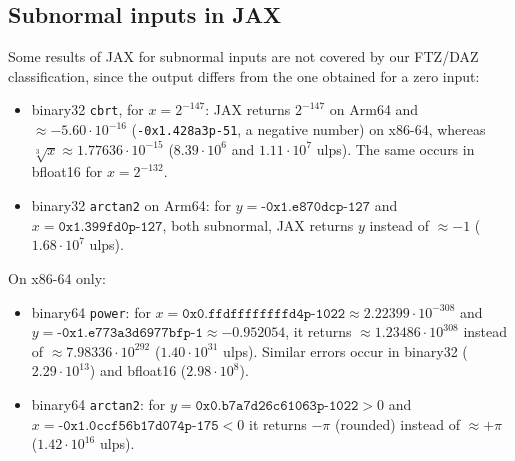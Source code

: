 \documentclass[11pt,a4paper]{article}
\begin{document}
\subsection{Subnormal inputs in JAX}
Some results of JAX for subnormal inputs are not covered by our FTZ/DAZ classification, since the output differs from the one obtained for a zero input:
\begin{itemize}
\item binary32 \texttt{cbrt}, for $x=2^{-147}$: JAX returns $2^{-147}$ on Arm64 and $\approx -5.60\cdot10^{-16}$ (\texttt{-0x1.428a3p-51}, a negative number) on x86-64, whereas $\sqrt[3]{x}\approx 1.77636\cdot10^{-15}$ ($8.39\cdot10^6$ and $1.11\cdot10^7$ ulps). The same occurs in bfloat16 for $x=2^{-132}$.
\item binary32 \texttt{arctan2} on Arm64: for $y=\texttt{-0x1.e870dcp-127}$ and $x=\texttt{0x1.399fd0p-127}$, both subnormal, JAX returns $y$ instead of $\approx -1$ ($1.68\cdot10^7$ ulps).
\end{itemize}
On x86-64 only:
\begin{itemize}
\item binary64 \texttt{power}: for $x=\texttt{0x0.ffdffffffffd4p-1022}\approx 2.22399\cdot10^{-308}$ and $y=\texttt{-0x1.e773a3d6977bfp-1}\approx -0.952054$, it returns $\approx 1.23486\cdot10^{308}$ instead of $\approx 7.98336\cdot10^{292}$ ($1.40\cdot10^{31}$ ulps). Similar errors occur in binary32 ($2.29\cdot10^{13}$) and bfloat16 ($2.98\cdot10^8$).
\item binary64 \texttt{arctan2}: for $y=\texttt{0x0.b7a7d26c61063p-1022}>0$ and $x=\texttt{-0x1.0ccf56b17d074p-175}<0$ it returns $-\pi$ (rounded) instead of $\approx +\pi$ ($1.42\cdot10^{16}$ ulps).
\end{itemize}
\end{document}
